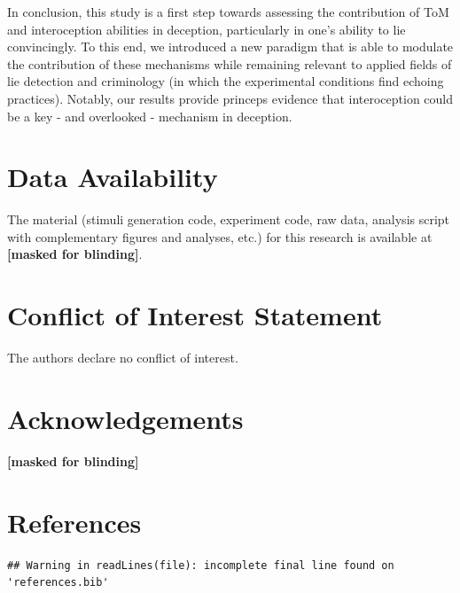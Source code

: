 \documentclass[
  man,mask,floatsintext]{apa6}
\begin{document}
In conclusion, this study is a first step towards assessing the contribution of ToM and interoception abilities in deception, particularly in one's ability to lie convincingly. To this end, we introduced a new paradigm that is able to modulate the contribution of these mechanisms while remaining relevant to applied fields of lie detection and criminology (in which the experimental conditions find echoing practices). Notably, our results provide princeps evidence that interoception could be a key - and overlooked - mechanism in deception.

\hypertarget{data-availability}{%
\section{Data Availability}\label{data-availability}}

The material (stimuli generation code, experiment code, raw data, analysis script with complementary figures and analyses, etc.) for this research is available at
\textbf{{[}masked for blinding{]}}.

\hypertarget{conflict-of-interest-statement}{%
\section{Conflict of Interest Statement}\label{conflict-of-interest-statement}}

The authors declare no conflict of interest.

\hypertarget{acknowledgements}{%
\section{Acknowledgements}\label{acknowledgements}}

\textbf{{[}masked for blinding{]}}

\newpage

\hypertarget{references}{%
\section{References}\label{references}}

\begin{verbatim}
## Warning in readLines(file): incomplete final line found on 'references.bib'
\end{verbatim}

\begingroup
\setlength{\parindent}{-0.5in}
\setlength{\leftskip}{0.5in}
\end{document}
